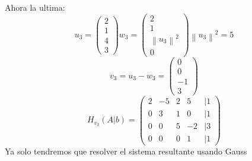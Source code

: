 Ahora la ultima:
\[
        u_3 = \begin{pmatrix}
                2 \\
                1 \\
                4 \\
                3
        \end{pmatrix}
        w_3 = \begin{pmatrix}
                2                        \\
                1                        \\
                \left \| u_3 \right \|^2 \\
                0
        \end{pmatrix}
        \left \| u_3 \right \|^2 = 5
\]
\[v_3 = u_3 - w_3 = \begin{pmatrix}
                0  \\
                0  \\
                -1 \\
                3
        \end{pmatrix}\]
\[
        H_{v_3}(A|b) = \begin{pmatrix}
                2 & -5 & 2 & 5  & |1 \\
                0 & 3  & 1 & 0  & |1 \\
                0 & 0  & 5 & -2 & |3 \\
                0 & 0  & 0 & 1  & |1
        \end{pmatrix}
\]
Ya solo tendremos que resolver el sistema resultante usando Gauss